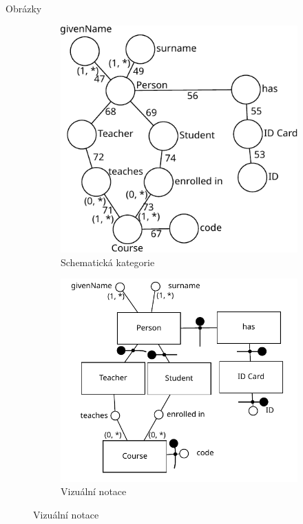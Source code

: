 \documentclass[a0paper]{uioposter}
\begin{document}
\begin{frame}
\begin{block}{Obrázky}
\begin{figure}
\begin{subfigure}{0.2604\textwidth}
        \includegraphics[width=\textwidth]{./images/university-schemcat.pdf}
        \caption*{Schematická kategorie}
      \end{subfigure}
      \hspace{3cm}
      \begin{subfigure}{0.3\textwidth}
        \includegraphics[width=\textwidth]{./images/university-scv.pdf}
        \caption*{Vizuální notace}
      \end{subfigure}
    \end{figure}
    \vspace{1cm}
  \end{block}


\end{frame}
\end{document}
